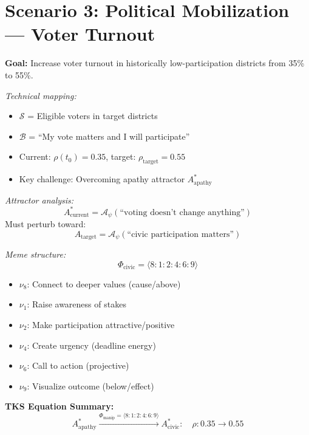 \documentclass[11pt,twoside]{book}
\theoremstyle{definition}
\theoremstyle{plain}
\theoremstyle{remark}
\newcommand{\noe}[1]{\nu_{#1}}
\newcommand{\Frac}{\Phi}
\newcommand{\PsychAttractor}{\mathcal{A}_\psi}
\newcommand{\ManipFrac}{\Phi_{\mathrm{manip}}}
\begin{document}
\section{Scenario 3: Political Mobilization --- Voter Turnout}

\begin{tcolorbox}[colback=yellow!5!white,colframe=yellow!65!black,title=\textbf{Scenario: Voter Turnout Campaign},breakable]

\textbf{Goal:} Increase voter turnout in historically low-participation districts from 35\% to 55\%.

\textit{Technical mapping:}
\begin{itemize}
    \item $\mathcal{S}$ = Eligible voters in target districts
    \item $\mathcal{B}$ = ``My vote matters and I will participate''
    \item Current: $\rho(t_0) = 0.35$, target: $\rho_{\mathrm{target}} = 0.55$
    \item Key challenge: Overcoming apathy attractor $A_{\mathrm{apathy}}^*$
\end{itemize}

\textit{Attractor analysis:}
\[
    A_{\mathrm{current}}^* = \PsychAttractor(\text{``voting doesn't change anything''})
\]
Must perturb toward:
\[
    A_{\mathrm{target}} = \PsychAttractor(\text{``civic participation matters''})
\]

\textit{Meme structure:}
\[
    \Frac_{\mathrm{civic}} = \langle 8:1:2:4:6:9 \rangle
\]
\begin{itemize}
    \item $\noe{8}$: Connect to deeper values (cause/above)
    \item $\noe{1}$: Raise awareness of stakes
    \item $\noe{2}$: Make participation attractive/positive
    \item $\noe{4}$: Create urgency (deadline energy)
    \item $\noe{6}$: Call to action (projective)
    \item $\noe{9}$: Visualize outcome (below/effect)
\end{itemize}

\textbf{TKS Equation Summary:}
\begin{equation}
\boxed{
    A_{\mathrm{apathy}}^* \xrightarrow{\ManipFrac = \langle 8:1:2:4:6:9 \rangle} A_{\mathrm{civic}}^*
    : \quad \rho : 0.35 \to 0.55
}
\end{equation}

\end{tcolorbox}
\end{document}
